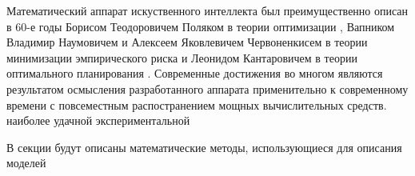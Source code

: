 Математический аппарат искуственного интеллекта был  преимущественно описан в 60-е годы
Борисом Теодоровичем Поляком в теории оптимизации \cite{kantorovich1960mathematical}, 
Вапником Владимир Наумовичем и Алексеем Яковлевичем Червоненкисем \cite{вапник1974теория} в теории минимизации эмпирического риска
и Леонидом Кантаровичем в теории оптимального планирования \cite{kantorovich1960mathematical}.
Современные достижения во многом являются результатом
осмысления разработанного аппарата применительно к современному времени с
повсеместным распостранением мощных вычислительных средств.
наиболее удачной экспериментальной 

В секции будут описаны математические методы,
использующиеся для описания моделей  


